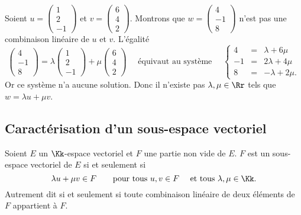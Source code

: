 \documentclass[class=report,crop=false]{standalone}
\begin{document}
\begin{exemple}
  Soient $u = \left(\begin{smallmatrix}1\\ 2\\ -1\end{smallmatrix}\right)$ et $v =
  \left(\begin{smallmatrix}6\\4\\2\end{smallmatrix}\right)$. Montrons que $ w = \left(\begin{smallmatrix}4\\ -1\\ 8\end{smallmatrix}\right)$
  n'est pas une combinaison linéaire de $u$ et $v$.  L'égalité
  $$\begin{pmatrix}4\\-1\\8\end{pmatrix} = \lambda\begin{pmatrix}1\\2\\-1\end{pmatrix} + \mu\begin{pmatrix}6\\4\\2\end{pmatrix}
  \quad \text{ équivaut au système } \quad
\left\{\begin{array}{rcl}
4 & = &\lambda + 6 \mu\\ -1 & = &2\lambda + 4\mu\\ 8 & = & -\lambda + 2\mu.
\end{array}\right.$$
  Or ce système n'a aucune solution.
  Donc il n'existe pas $\lambda,\mu \in \Rr$ tels que $w=\lambda u + \mu v$.
\end{exemple}



\subsection{Caractérisation d'un sous-espace vectoriel}



\begin{theoreme}
Soient $E$ un $\Kk$-espace vectoriel et $F$ une partie non vide de $E$.
$F$ est un sous-espace vectoriel de $E$ si et seulement si
$$\lambda u + \mu v \in F \qquad \text{pour tous } u,v \in F \quad \text{ et tous } \lambda, \mu \in \Kk.$$
Autrement dit si et seulement si toute combinaison linéaire de deux éléments
de $F$ appartient à $F$.
\end{theoreme}
\end{document}
